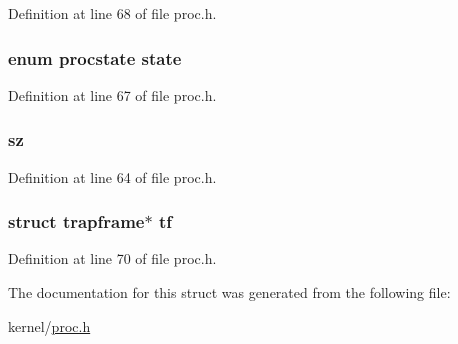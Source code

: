 Definition at line 68 of file proc.\-h.

\hypertarget{structproc_a59425505202fc7e53a519d95707cb26b}{
\subsubsection[{state}]{\setlength{\rightskip}{0pt plus 5cm}enum {\bf procstate} state}}\label{structproc_a59425505202fc7e53a519d95707cb26b}


Definition at line 67 of file proc.\-h.

\hypertarget{structproc_aad1b9173bbedb8de751a61a0864dcb3b}{
\subsubsection[{sz}]{ sz}}\label{structproc_aad1b9173bbedb8de751a61a0864dcb3b}


Definition at line 64 of file proc.\-h.

\hypertarget{structproc_a5a8b7d6a32569e70bff92059bd93e602}{
\subsubsection[{tf}]{\setlength{\rightskip}{0pt plus 5cm}struct {\bf trapframe}$\ast$ tf}}\label{structproc_a5a8b7d6a32569e70bff92059bd93e602}


Definition at line 70 of file proc.\-h.



The documentation for this struct was generated from the following file\-:\begin{DoxyCompactItemize}
\item 
kernel/\hyperlink{proc_8h}{proc.\-h}\end{DoxyCompactItemize}
